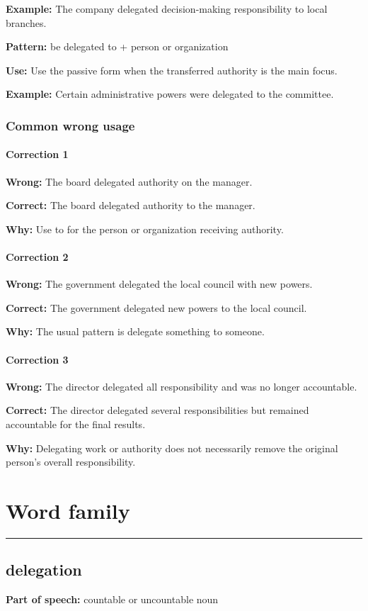 \documentclass[11pt]{article}
\newcommand{\sectionrule}{\par\vspace{-0.5em}\noindent\textcolor{Accent}{\rule{\linewidth}{0.6pt}}\par}
\begin{document}
\textbf{Example:} The company delegated decision-making responsibility to local branches.

\textbf{Pattern:} be delegated to + person or organization

\textbf{Use:} Use the passive form when the transferred authority is the main focus.

\textbf{Example:} Certain administrative powers were delegated to the committee.

\subsubsection{Common wrong usage}
\paragraph{Correction 1}
\textbf{Wrong:} The board delegated authority on the manager.

\textbf{Correct:} The board delegated authority to the manager.

\textbf{Why:} Use to for the person or organization receiving authority.

\paragraph{Correction 2}
\textbf{Wrong:} The government delegated the local council with new powers.

\textbf{Correct:} The government delegated new powers to the local council.

\textbf{Why:} The usual pattern is delegate something to someone.

\paragraph{Correction 3}
\textbf{Wrong:} The director delegated all responsibility and was no longer accountable.

\textbf{Correct:} The director delegated several responsibilities but remained accountable for the final results.

\textbf{Why:} Delegating work or authority does not necessarily remove the original person's overall responsibility.

\section{Word family}
\sectionrule
\subsection{delegation}
\textbf{Part of speech:} countable or uncountable noun
\end{document}
